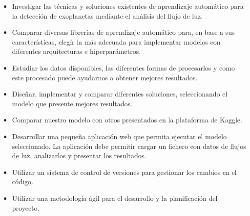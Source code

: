 
\begin{itemize}
    \item Investigar las técnicas y soluciones existentes de aprendizaje automático para la detección de exoplanetas mediante el análisis del flujo de luz.
    \item Comparar diversas librerías de aprendizaje automático para, en base a sus características, elegír la más adecuada para implementar modelos con diferentes arquitecturas e hiperparámetros.
    \item Estudiar los datos disponibles, las diferentes formas de procesarlos y como este procesado puede ayudarnos a obtener mejores resultados.
    \item Diseñar, implementar y comparar diferentes soluciones, seleccionando el modelo que presente mejores resultados.
    \item Comparar nuestro modelo con otros presentados en la plataforma de Kaggle.
    \item Desarrollar una pequeña aplicación web que permita ejecutar el modelo seleccionado. La aplicación debe permitir cargar un fichero con datos de flujos de luz, analizarlos y presentar los resultados.
    \item Utilizar un sistema de control de versiones para gestionar los cambios en el código.
    \item Utilizar una metodología ágil para el desarrollo y la planificación del proyecto.
\end{itemize}
